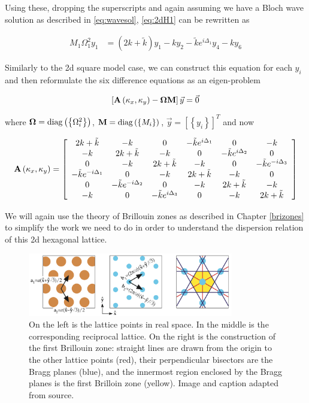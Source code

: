 Using these, dropping the superscripts and again assuming we have a Bloch wave
solution as described in \eqref{eq:wavesol}, \eqref{eq:2dH1} can be rewritten as 

\begin{align}
M_1\Omega_1^{2}y_1
      &=\left(2k+\tilde{k}\right)y_1-ky_2-\tilde{k}e^{i\Delta_1}y_4-ky_6
\label{eq:2dH2}
\end{align}

Similarly to the 2d square model case, we can construct this equation for each
$y_i$ and then reformulate the six difference equations as an eigen-problem

\begin{align}
  \left[\mathbf{A}\left(\kappa_{x},\kappa_{y}\right)-\mathbf{\Omega}\mathbf{M}\right]\vec{y}=\vec{0}
\label{eq:hexeig}
\end{align}

where $\mathbf{\Omega}=\operatorname{diag}\left(\left\{\Omega_i^2\right\}\right)$,
$\mathbf{M}=\operatorname{diag}\left(\left\{M_i\right\}\right)$,
$\vec{y}=\left[\left\{y_i\right\}\right]^T$ and now

\begin{align}
  \mathbf{A}\left(\kappa_{x},\kappa_{y}\right)=\left[
\begin{array}{cccccc}
2k+\tilde{k} & -k & 0 & -\tilde{k}e^{i\Delta_1} & 0 & -k\\
-k & 2k+\tilde{k} & -k & 0 & -\tilde{k}e^{i\Delta_2} & 0\\
0 & -k & 2k +\tilde{k} & -k & 0 & -\tilde{k}e^{-i\Delta_3}\\
-\tilde{k}e^{-i\Delta_1} & 0 & -k & 2k+\tilde{k} & -k & 0\\
0 & -\tilde{k}e^{-i\Delta_2} & 0 & -k & 2k+\tilde{k} & -k\\
-k & 0 & -\tilde{k}e^{i\Delta_3} & 0 & -k & 2k+\tilde{k}
\end{array}\right]
\end{align}

We will again use the theory of Brillouin zones as described in Chapter
\ref{brizones} to simplify the work we need to do in order to understand the
dispersion relation of this 2d hexagonal lattice.

\begin{figure}[!h]
\centering
\includegraphics[width=0.8\textwidth]{imgs/bzonehex.png}
\caption{\label{fig:bzonehex} On the left is the lattice points in real space.
    In the middle is the corresponding reciprocal lattice. On the right is the
    construction of the first Brillouin zone: straight lines are drawn from the
    origin to the other lattice points (red), their perpendicular bisectors are
    the Bragg planes (blue), and the innermost region enclosed by the Bragg
    planes is the first Brilloin zone (yellow). Image and caption adapted from
    source.\cite{MITnp}}
\end{figure}


